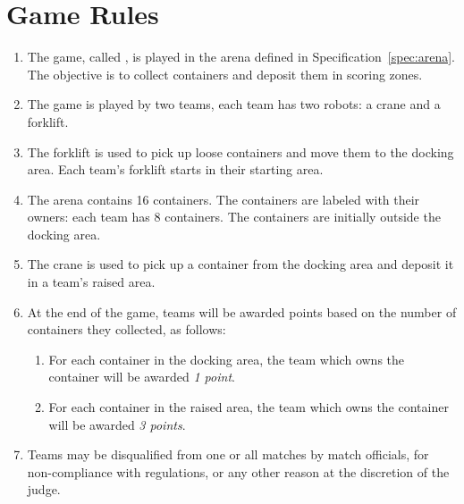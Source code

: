 \section{Game Rules}
\label{sec:rules}

\begin{enumerate}
  \item The game, called \emph{\gamename}, is played in the arena defined in
        Specification~\ref{spec:arena}. The objective is to collect containers
        and deposit them in scoring zones.
  \item The game is played by two teams, each team has two robots: a crane and
        a forklift.
  \item The forklift is used to pick up loose containers and move them to the
        docking area. Each team's forklift starts in their starting area.
  \item The arena contains 16 containers. The containers are labeled with
        their owners: each team has 8 containers. The containers are
        initially outside the docking area.
  \item The crane is used to pick up a container from the docking area and
        deposit it in a team's raised area.
  \item At the end of the game, teams will be awarded points based on the
        number of containers they collected, as follows:
  \begin{enumerate}
    \item For each container in the docking area, the team which owns the
          container will be awarded \emph{1 point}.
    \item For each container in the raised area, the team which owns the
          container will be awarded \emph{3 points}.
  \end{enumerate}
  \item Teams may be disqualified from one or all matches by match officials,
        for non-compliance with regulations, or any other reason at the
        discretion of the judge.
\end{enumerate}
